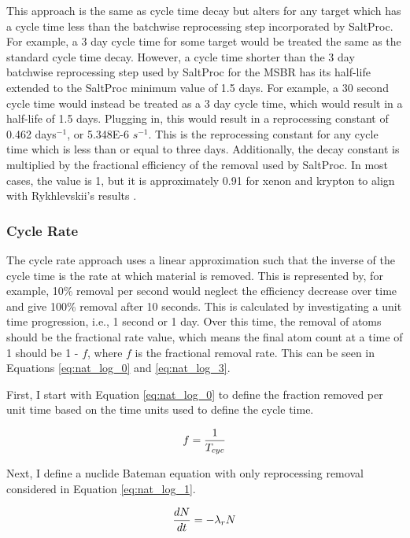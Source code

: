 This approach is the same as cycle time decay but alters for any target which has a cycle time less than the batchwise reprocessing step incorporated by SaltProc. For example, a 3 day cycle time for some target would be treated the same as the standard cycle time decay. However, a cycle time shorter than the 3 day batchwise reprocessing step used by SaltProc for the MSBR has its half-life extended to the SaltProc minimum value of 1.5 days. For example, a 30 second cycle time would instead be treated as a 3 day cycle time, which would result in a half-life of 1.5 days. Plugging in, this would result in a reprocessing constant of 0.462 days$^{-1}$, or 5.348E-6 $s^{-1}$. This is the reprocessing constant for any cycle time which is less than or equal to three days. Additionally, the decay constant is multiplied by the fractional efficiency of the removal used by SaltProc. In most cases, the value is 1, but it is approximately 0.91 for xenon and krypton to align with Rykhlevskii's results \cite{rykhlevskii_fuel_2020}.

\subsubsection{Cycle Rate}
\label{s:CR}

The cycle rate approach uses a linear approximation such that the inverse of the cycle time is the rate at which material is removed. This is represented by, for example, 10\% removal per second would neglect the efficiency decrease over time and give 100\% removal after 10 seconds. This is calculated by investigating a unit time progression, i.e., 1 second or 1 day. Over this time, the removal of atoms should be the fractional rate value, which means the final atom count at a time of 1 should be 1 - $f$, where $f$ is the fractional removal rate. This can be seen in Equations \eqref{eq:nat_log_0} and \eqref{eq:nat_log_3}.

First, I start with Equation \eqref{eq:nat_log_0} to define the fraction removed per unit time based on the time units used to define the cycle time.

\begin{equation} \hfill
f = \frac{1}{T_{cyc}}
\hfill\label{eq:nat_log_0} \end{equation}

Next, I define a nuclide Bateman equation with only reprocessing removal considered in Equation \eqref{eq:nat_log_1}.

\begin{equation} \hfill
\frac{dN}{dt} = -\lambda_r N
\hfill\label{eq:nat_log_1} \end{equation}

